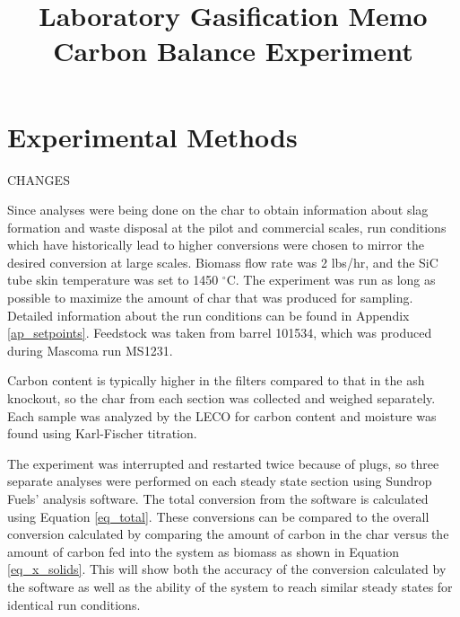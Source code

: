 \documentclass[11pt,twocolumn]{article}
\date{}
\title{Laboratory Gasification Memo\\Carbon Balance Experiment \vspace{-6ex}}
\begin{document}

\section*{Experimental Methods}

CHANGES

Since analyses were being done on the char to obtain information about slag formation and waste disposal at the pilot and commercial scales, run conditions which have historically lead to higher conversions were chosen to mirror the desired conversion at large scales.  Biomass flow rate was 2 lbs/hr, and the SiC tube skin temperature was set to 1450 $^\circ$C.  The experiment was run as long as possible to maximize the amount of char that was produced for sampling.  Detailed information about the run conditions can be found in Appendix \ref{ap_setpoints}.  Feedstock was taken from barrel 101534, which was produced during Mascoma run MS1231.

Carbon content is typically higher in the filters compared to that in the ash knockout, so the char from each section was collected and weighed separately.  Each sample was analyzed by the LECO for carbon content and moisture was found using Karl-Fischer titration.

The experiment was interrupted and restarted twice because of plugs, so three separate analyses were performed on each steady state section using Sundrop Fuels' analysis software.  The total conversion from the software is calculated using Equation \ref{eq_total}.  These conversions can be compared to the overall conversion calculated by comparing the amount of carbon in the char versus the amount of carbon fed into the system as biomass as shown in Equation \ref{eq_x_solids}.  This will show both the accuracy of the conversion calculated by the software as well as the ability of the system to reach similar steady states for identical run conditions.
\end{document}
